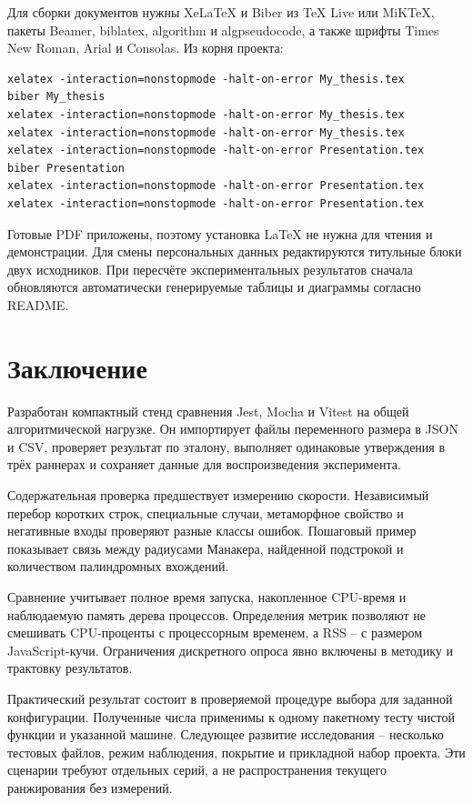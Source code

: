 Для сборки документов нужны XeLaTeX и Biber из TeX Live или MiKTeX, пакеты Beamer, biblatex, algorithm и algpseudocode, а также шрифты Times New Roman, Arial и Consolas. Из корня проекта:
\begin{lstlisting}
xelatex -interaction=nonstopmode -halt-on-error My_thesis.tex
biber My_thesis
xelatex -interaction=nonstopmode -halt-on-error My_thesis.tex
xelatex -interaction=nonstopmode -halt-on-error My_thesis.tex
xelatex -interaction=nonstopmode -halt-on-error Presentation.tex
biber Presentation
xelatex -interaction=nonstopmode -halt-on-error Presentation.tex
xelatex -interaction=nonstopmode -halt-on-error Presentation.tex
\end{lstlisting}
Готовые PDF приложены, поэтому установка LaTeX не нужна для чтения и демонстрации. Для смены персональных данных редактируются титульные блоки двух исходников. При пересчёте экспериментальных результатов сначала обновляются автоматически генерируемые таблицы и диаграммы согласно README.

\section{Заключение}


Разработан компактный стенд сравнения Jest, Mocha и Vitest на общей алгоритмической нагрузке. Он импортирует файлы переменного размера в JSON и CSV, проверяет результат по эталону, выполняет одинаковые утверждения в трёх раннерах и сохраняет данные для воспроизведения эксперимента.

Содержательная проверка предшествует измерению скорости. Независимый перебор коротких строк, специальные случаи, метаморфное свойство и негативные входы проверяют разные классы ошибок. Пошаговый пример показывает связь между радиусами Манакера, найденной подстрокой и количеством палиндромных вхождений.

Сравнение учитывает полное время запуска, накопленное CPU-время и наблюдаемую память дерева процессов. Определения метрик позволяют не смешивать CPU-проценты с процессорным временем, а RSS -- с размером JavaScript-кучи. Ограничения дискретного опроса явно включены в методику и трактовку результатов.

Практический результат состоит в проверяемой процедуре выбора для заданной конфигурации. Полученные числа применимы к одному пакетному тесту чистой функции и указанной машине. Следующее развитие исследования -- несколько тестовых файлов, режим наблюдения, покрытие и прикладной набор проекта. Эти сценарии требуют отдельных серий, а не распространения текущего ранжирования без измерений.
\label{body-end}

